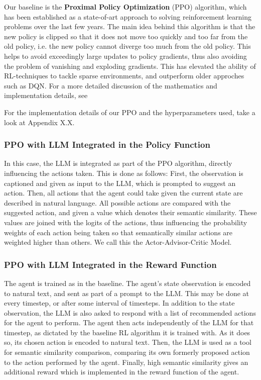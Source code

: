 \documentclass[conference]{IEEEtran}
\begin{document}
Our baseline is the \textbf{Proximal Policy Optimization} (PPO) algorithm, which has been established as a state-of-art approach to solving reinforcement learning problems over the last few years. The main idea behind this algorithm is that the new policy is clipped so that it does not move too quickly and too far from the old policy, i.e. the new policy cannot diverge too much from the old policy. This helps to avoid exceedingly large updates to policy gradients, thus also avoiding the problem of vanishing and exploding gradients. This has elevated the ability of RL-techniques to tackle sparse environments, and outperform older approches such as DQN. For a more detailed discussion of the mathematics and implementation details, see \cite{OpenAIPPO}

For the implementation details of our PPO and the hyperparameters used, take a look at Appendix X.X.


\subsubsection{PPO with LLM Integrated in the Policy Function}

In this case, the LLM is integrated as part of the PPO algorithm, directly influencing the actions taken. This is done as follows: First, the observation is captioned and given as input to the LLM, which is prompted to suggest an action. Then, all actions that the agent could take given the current state are described in natural language. All possible actions are compared with the suggested action, and given a value which denotes their semantic similarity. These values are joined with the logits of the actions, thus influencing the probability weights of each action being taken so that semantically similar actions are weighted higher than others. We call this the Actor-Advisor-Critic Model.

\subsubsection{PPO with LLM Integrated in the Reward Function}

The agent is trained as in the baseline. The agent's state observation is encoded to natural text, and sent as part of a prompt to the LLM. This may be done at every timestep, or after some interval of timesteps. In addition to the state observation, the LLM is also asked to respond with a list of recommended actions for the agent to perform. The agent then acts independently of the LLM for that timestep, as dictated by the baseline RL algorithm it is trained with. As it does so, its chosen action is encoded to natural text. Then, the LLM is used as a tool for semantic similarity comparison, comparing its own formerly proposed action to the action performed by the agent. Finally, high semantic similarity gives an additional reward which is implemented in the reward function of the agent. 
\end{document}
